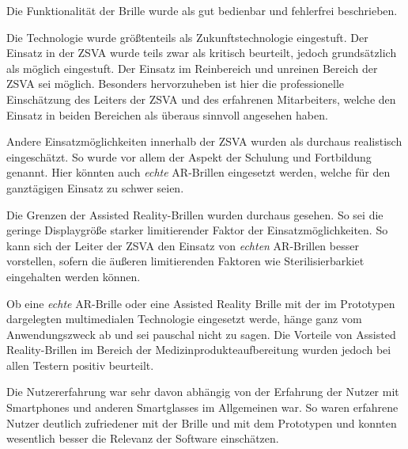 Die Funktionalität der Brille wurde als gut bedienbar und fehlerfrei beschrieben.

Die Technologie wurde größtenteils als Zukunftstechnologie eingestuft. Der Einsatz in der ZSVA wurde teils zwar als kritisch beurteilt, jedoch grundsätzlich als möglich eingestuft. Der Einsatz im Reinbereich und unreinen Bereich der ZSVA sei möglich. Besonders hervorzuheben ist hier die professionelle Einschätzung des Leiters der ZSVA und des erfahrenen Mitarbeiters, welche den Einsatz in beiden Bereichen als überaus sinnvoll angesehen haben.

Andere Einsatzmöglichkeiten innerhalb der ZSVA wurden als durchaus realistisch eingeschätzt. So wurde vor allem der Aspekt der Schulung und Fortbildung genannt. Hier könnten auch \emph{echte} AR-Brillen eingesetzt werden, welche für den ganztägigen Einsatz zu schwer seien.

Die Grenzen der Assisted Reality-Brillen wurden durchaus gesehen. So sei die geringe Displaygröße starker limitierender Faktor der Einsatzmöglichkeiten. So kann sich der Leiter der ZSVA den Einsatz von \emph{echten} AR-Brillen besser vorstellen, sofern die äußeren limitierenden Faktoren wie Sterilisierbarkiet eingehalten werden können.

Ob eine \emph{echte} AR-Brille oder eine Assisted Reality Brille mit der im Prototypen dargelegten multimedialen Technologie eingesetzt werde, hänge ganz vom Anwendungszweck ab und sei pauschal nicht zu sagen. Die Vorteile von Assisted Reality-Brillen im Bereich der Medizinprodukteaufbereitung wurden jedoch bei allen Testern positiv beurteilt.

Die Nutzererfahrung war sehr davon abhängig von der Erfahrung der Nutzer mit Smartphones und anderen Smartglasses im Allgemeinen war. So waren erfahrene Nutzer deutlich zufriedener mit der Brille und mit dem Prototypen und konnten wesentlich besser die Relevanz der Software einschätzen. 
